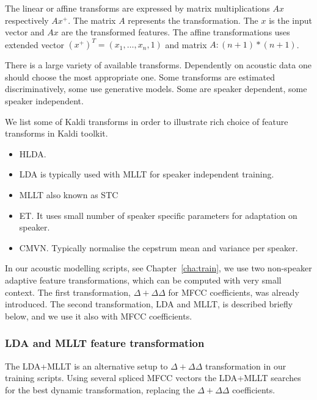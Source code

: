 {The linear or affine transforms are expressed by matrix multiplications $Ax$ respectively $Ax^+$.
The matrix $A$ represents the transformation. 
The $x$ is the input vector and $Ax$ are the transformed features.
The affine transformations uses extended vector $(x^+)^T = (x_1, \ldots, x_n, 1)$ and matrix $A: (n+1)*(n+1)$.

There is a large variety of available transforms. 
Dependently on acoustic data one should choose the most appropriate one.
Some transforms are estimated discriminatively, some use generative models.
Some are speaker dependent, some speaker independent.

We list some of Kaldi transforms in order to illustrate rich choice of feature transforms in Kaldi toolkit.
\begin{itemize}
    \item \acf{HLDA}\cite{gales1999semi}.
    \item \acf{LDA}\cite{gopinath1998maximum} is typically used with \acs{MLLT} for speaker independent training.
    \item \acf{MLLT} also known as \acf{STC}\cite{gopinath1998maximum}
    \item \acf{ET}\cite{povey2011exponential}. It uses small number of speaker specific parameters for adaptation on speaker.
    \item \acf{CMVN}\cite{molau2003feature}. Typically normalise the cepstrum mean and variance per speaker.
\end{itemize}

In our acoustic modelling scripts, see Chapter~\ref{cha:train},  we use two non-speaker adaptive feature transformations, which can be computed with very small context. 
The first transformation, $\Delta+\Delta\Delta$  for \ac{MFCC} coefficients, was already introduced.
The second transformation, \ac{LDA} and \ac{MLLT}, is described briefly below, and we use it also with \ac{MFCC} coefficients.

\subsubsection*{\acl{LDA} and \ac{MLLT} feature transformation}
The \ac{LDA}+\ac{MLLT} is an alternative setup to $\Delta+\Delta\Delta$ transformation in our training scripts.
Using several spliced \ac{MFCC} vectors the \ac{LDA}+\ac{MLLT} searches for the best dynamic transformation, replacing the $\Delta+\Delta\Delta$ coefficients.

}
